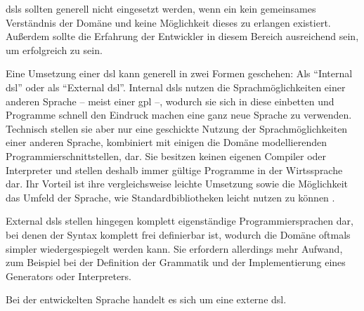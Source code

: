     \glspl{dsl} sollten generell nicht eingesetzt werden,
    wenn ein kein gemeinsames Verständnis der Domäne und keine Möglichkeit dieses zu erlangen
    existiert.
    Außerdem sollte die Erfahrung der Entwickler in diesem Bereich ausreichend sein,
    um erfolgreich zu sein.

    Eine Umsetzung einer \gls{dsl} kann generell in zwei Formen geschehen:
    Als "`Internal \gls{dsl}"' oder als "`External \gls{dsl}"'.
    Internal \glspl{dsl} nutzen die Sprachmöglichkeiten einer anderen Sprache
    -- meist einer \gls{gpl} --, wodurch sie sich in diese einbetten und
    Programme schnell den Eindruck machen eine ganz neue Sprache zu verwenden.
    Technisch stellen sie aber nur eine geschickte Nutzung der Sprachmöglichkeiten
    einer anderen Sprache, kombiniert mit einigen die Domäne modellierenden Programmierschnittstellen, dar.
    Sie besitzen keinen eigenen Compiler oder Interpreter und stellen deshalb immer gültige Programme
    in der Wirtssprache dar.
    Ihr Vorteil ist ihre vergleichsweise leichte Umsetzung sowie die Möglichkeit das Umfeld der Sprache,
    wie Standardbibliotheken leicht nutzen zu können
    \cite[Kapitel 2.8.1]{voelter:DslEngineering}.

    External \glspl{dsl} stellen hingegen komplett eigenständige Programmiersprachen dar,
    bei denen der Syntax komplett frei definierbar ist,
    wodurch die Domäne oftmals simpler wiedergespiegelt werden kann.
    Sie erfordern allerdings mehr Aufwand, zum Beispiel bei der Definition der Grammatik
    und der Implementierung eines Generators oder Interpreters.

    Bei der entwickelten Sprache handelt es sich um eine externe \gls{dsl}.